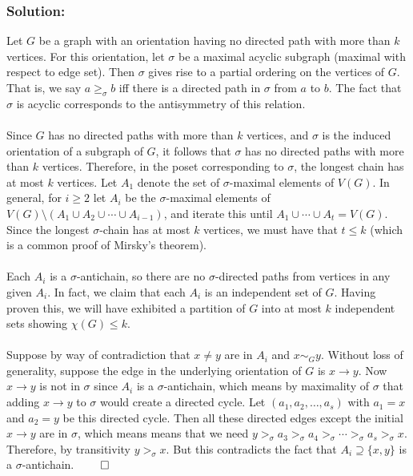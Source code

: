 \documentclass[10pt,a4paper]{article}
\newcommand{\1}{\mathbf{1}}
\begin{document}
\subsubsection*{Solution:}
Let $G$ be a graph with an orientation having no directed path with more than $k$ vertices.  For this orientation, let $\sigma$ be a maximal acyclic subgraph (maximal with respect to edge set).  Then $\sigma$ gives rise to a partial ordering on the vertices of $G$.  That is, we say $a \geq_{\sigma} b$ iff there is a directed path in $\sigma$ from $a$ to $b$.  The fact that $\sigma$ is acyclic corresponds to the antisymmetry of this relation.
\paragraph*{}Since $G$ has no directed paths with more than $k$ vertices, and $\sigma$ is the induced orientation of a subgraph of $G$, it follows that $\sigma$ has no directed paths with more than $k$ vertices.  Therefore, in the poset corresponding to $\sigma$, the longest chain has at most $k$ vertices.  Let $A_1$ denote the set of $\sigma$-maximal elements of $V(G)$.  In general, for $i \geq 2$ let $A_i$ be the $\sigma$-maximal elements of $V(G) \setminus (A_1 \cup A_2 \cup \cdots \cup A_{i-1} )$, and iterate this until $A_1 \cup \cdots \cup A_t = V(G)$.  Since the longest $\sigma$-chain has at most $k$ vertices, we must have that $t \leq k$ (which is a common proof of Mirsky's theorem).
\paragraph*{}Each $A_i$ is a $\sigma$-antichain, so there are no $\sigma$-directed paths from vertices in any given $A_i$.  In fact, we claim that each $A_i$ is an independent set of $G$.  Having proven this, we will have exhibited a partition of $G$ into at most $k$ independent sets showing $\chi(G) \leq k$.
\paragraph*{}Suppose by way of contradiction that $x \neq y$ are in $A_i$ and $x \sim_{G} y$.  Without loss of generality, suppose the edge in the underlying orientation of $G$ is $x \to y$.  Now $x \to y$ is not in $\sigma$ since $A_i$ is a $\sigma$-antichain, which means by maximality of $\sigma$ that adding $x \to y$ to $\sigma$ would create a directed cycle.  Let $(a_1, a_2, \ldots, a_s)$ with $a_1 = x$ and $a_2 = y$ be this directed cycle.  Then all these directed edges except the initial $x \to y$ are in $\sigma$, which means means that we need $y >_{\sigma} a_3 >_{\sigma} a_4 >_{\sigma} \cdots >_{\sigma} a_s >_{\sigma} x$.  Therefore, by transitivity $y >_{\sigma} x$.  But this contradicts the fact that $A_i \supseteq \{x,y\}$ is a $\sigma$-antichain. $\qed$
\end{document}
